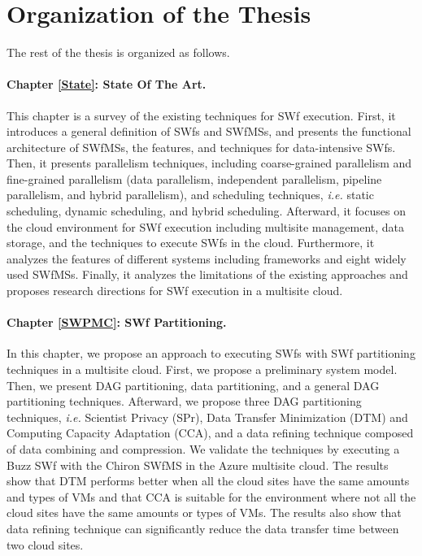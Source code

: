 \section{Organization of the Thesis}

The rest of the thesis is organized as follows.

\paragraph{Chapter \ref{State}: State Of The Art.} This chapter is a survey of the existing techniques for SWf execution. First, it introduces a general definition of SWfs and SWfMSs, and presents the functional architecture of SWfMSs, the features, and techniques for data-intensive SWfs. Then, it presents parallelism techniques, including coarse-grained parallelism and fine-grained parallelism (data parallelism, independent parallelism, pipeline parallelism, and hybrid parallelism), and scheduling techniques, \textit{i.e.} static scheduling, dynamic scheduling, and hybrid scheduling. Afterward, it focuses on the cloud environment for SWf execution including multisite management, data storage, and the techniques to execute SWfs in the cloud. Furthermore, it analyzes the features of different systems including frameworks and eight widely used SWfMSs. Finally, it analyzes the limitations of the existing approaches and proposes research directions for SWf execution in a multisite cloud.

\paragraph{Chapter \ref{SWPMC}: SWf Partitioning.} In this chapter, we propose an approach to executing SWfs with SWf partitioning techniques in a multisite cloud. First, we propose a preliminary system model. Then, we present DAG partitioning, data partitioning, and a general DAG partitioning techniques. Afterward, we propose three DAG partitioning techniques, \textit{i.e.} Scientist Privacy (SPr), Data Transfer Minimization (DTM) and Computing Capacity Adaptation (CCA), and a data refining technique composed of data combining and compression. We validate the techniques by executing a Buzz SWf with the Chiron SWfMS in the Azure multisite cloud. The results show that DTM performs better when all the cloud sites have the same amounts and types of VMs and that CCA is suitable for the environment where not all the cloud sites have the same amounts or types of VMs. The results also show that data refining technique can significantly reduce the data transfer time between two cloud sites.


